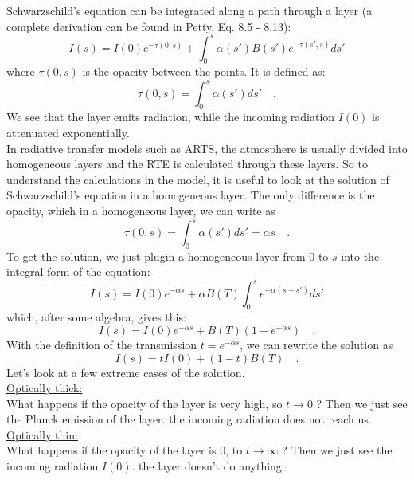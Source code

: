 Schwarzschild's equation can be integrated along a path through a layer
(a complete derivation can be found in Petty, Eq. 8.5 - 8.13):
\begin{equation}
	I(s) = I(0) e^{-\tau (0,s)} + \int_{0}^{s} \alpha (s') B(s') 
	e^{-\tau (s',s)} ds' 
\end{equation}
where $\tau(0,s)$ is the opacity between the points. It is defined as:
\begin{equation}
	\tau (0,s) = \int_{0}^{s} \alpha(s') ds' \quad .
\end{equation}
We see that the layer emits radiation, while the incoming radiation $I(0)$ is 
attenuated exponentially. \\
In radiative transfer models such as ARTS, the atmosphere is usually divided 
into homogeneous layers and the RTE is calculated through these layers. So to understand
the calculations in the model, it is useful to look at the solution of Schwarzschild's
equation in a homogeneous layer. The only difference is the opacity, which in a homogeneous
layer, we can write as
\begin{equation}
	\tau(0,s) = \int_{0}^{s} \alpha(s') ds' = \alpha s \quad .
\end{equation}
To get the solution, we just plugin a homogeneous layer from 0 to $s$ into the integral 
form of the equation:
\begin{equation}
	I(s) = I(0) e^{-\alpha s} + \alpha B(T)\int_{0}^{s} e^{-\alpha (s-s')} ds' 
\end{equation}
which, after some algebra, gives this:
\begin{equation}
	I(s) = I(0) e^{-\alpha s} + B(T) \left( 1-e^{-\alpha s}
        \right) \quad .
\end{equation}
With the definition of the transmission $t = e^{-\alpha s}$, we can rewrite the solution as
\begin{equation}
	I(s) = t I(0)  + \left( 1-t \right) B(T) \quad .
\end{equation}
Let's look at a few extreme cases of the solution.\\
\underline{Optically thick:}\\
What happens if the opacity of the layer is very high, so $ t\rightarrow0$ ? 
Then we just see the Planck emission of the layer. the incoming radiation does not reach us.\\
\underline{Optically thin:}\\
What happens if the opacity of the layer is 0, to $ t \rightarrow \infty$ ? Then we just see
the incoming radiation $I(0)$. the layer doesn't do anything.\\

